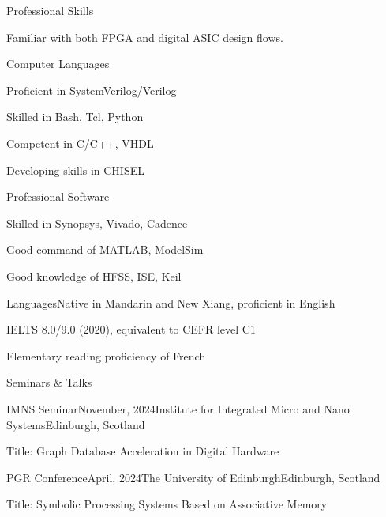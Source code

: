 \documentclass{resume} %
\begin{document}
\begin{rSection}{Professional Skills}

	Familiar with both FPGA and digital ASIC design flows. 
	
	\begin{rSubsection}{Computer Languages}{}{}{}
		\item Proficient in SystemVerilog/Verilog
		\item Skilled in Bash, Tcl, Python
		\item Competent in C/C++, VHDL
		\item Developing skills in CHISEL
	\end{rSubsection}

	\begin{rSubsection}{Professional Software}{}{}{}
		\item Skilled in Synopsys, Vivado, Cadence
		\item Good command of MATLAB, ModelSim
		\item Good knowledge of HFSS, ISE, Keil
	\end{rSubsection}

	\begin{rSubsection}{Languages}{}{Native in Mandarin and New Xiang, proficient in English}{}
		\item IELTS 8.0/9.0 (2020), equivalent to CEFR level C1
		\item Elementary reading proficiency of French
	\end{rSubsection}

\end{rSection}

\newpage

\begin{rSection}{Seminars \& Talks}
	
	
	\begin{rSubsection}{IMNS Seminar}{November, 2024}{Institute for Integrated Micro and Nano Systems}{Edinburgh, Scotland}
		\item Title: Graph Database Acceleration in Digital Hardware
	\end{rSubsection}
	
	\begin{rSubsection}{PGR Conference}{April, 2024}{The University of Edinburgh}{Edinburgh, Scotland}
		\item Title: Symbolic Processing Systems Based on Associative Memory
	\end{rSubsection}
	
\end{rSection}
\end{document}
